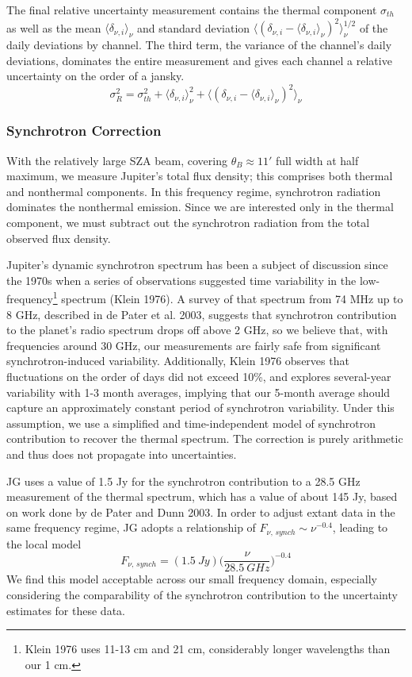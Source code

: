 \documentclass{article}
\begin{document}
	The final relative uncertainty measurement contains the thermal component $\sigma_{th}$ as well as the mean $\langle \delta_{\nu, i} \rangle_{\nu}$ and standard deviation $\Big\langle (\delta_{\nu, i} - \langle \delta_{\nu, i} \rangle_{\nu})^{2} \Big\rangle_{\nu}^{1/2}$ of the daily deviations by channel.
	The third term, the variance of the channel's daily deviations, dominates the entire measurement and gives each channel a relative uncertainty on the order of a jansky.
	$$ \sigma_{R}^{2} = \sigma_{th}^{2} + \langle \delta_{\nu, i} \rangle_{\nu}^{2}
		 + \Big\langle (\delta_{\nu, i} - \langle \delta_{\nu, i} \rangle_{\nu})^{2} \Big\rangle_{\nu} $$


\subsubsection{Synchrotron Correction}

	With the relatively large SZA beam, covering $\theta_{B} \approx 11'$ full width at half maximum, we measure Jupiter's total flux density; this comprises both thermal and nonthermal components.
	In this frequency regime, synchrotron radiation dominates the nonthermal emission.
	Since we are interested only in the thermal component, we must subtract out the synchrotron radiation from the total observed flux density.

	Jupiter's dynamic synchrotron spectrum has been a subject of discussion since the 1970s when a series of observations suggested time variability in the low-frequency\footnote{Klein 1976 uses 11-13 cm and 21 cm, considerably longer wavelengths than our 1 cm.} spectrum (Klein 1976).
	A survey of that spectrum from 74 MHz up to 8 GHz, described in de Pater et al. 2003, suggests that synchrotron contribution to the planet's radio spectrum drops off above 2 GHz, so we believe that, with frequencies around 30 GHz, our measurements are fairly safe from significant synchrotron-induced variability.
	Additionally, Klein 1976 observes that fluctuations on the order of days did not exceed 10\%, and explores several-year variability with 1-3 month averages, implying that our 5-month average should capture an approximately constant period of synchrotron variability.
	Under this assumption, we use a simplified and time-independent model of synchrotron contribution to recover the thermal spectrum.
	The correction is purely arithmetic and thus does not propagate into uncertainties.

	JG uses a value of 1.5 Jy for the synchrotron contribution to a 28.5 GHz measurement of the thermal spectrum, which has a value of about 145 Jy, based on work done by de Pater and Dunn 2003.
	In order to adjust extant data in the same frequency regime, JG adopts a relationship of $F_{\nu,\,synch} \sim \nu^{-0.4}$, leading to the local model
	$$F_{\nu,\,synch} =  (1.5 \ Jy)\Bigg(\frac{\nu}{28.5 \ GHz}\Bigg)^{-0.4}$$
	We find this model acceptable across our small frequency domain, especially considering the comparability of the synchrotron contribution to the uncertainty estimates for these data.
\end{document}
